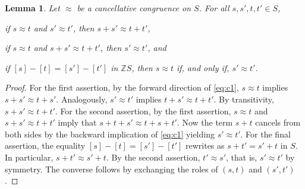 \documentclass[11pt]{scrartcl}
\theoremstyle{definition}
\theoremstyle{plain}
\newtheorem{lemma}[definition]{Lemma}
\theoremstyle{remark}
\begin{document}
	\begin{lemma}\label{lem:cancellation}
		Let $\approx$ be a cancellative congruence on $S$.
		For all $s, s', t, t' \in S$,
		\begin{assertions}
			\item if $s \approx t$ and $s' \approx t'$, then $s + s' \approx t+t'$,
			\item if $s \approx t$ and $s + s' \approx t+t'$, then $s' \approx t'$, and
			\item if $[s] - [t] = [s'] - [t']$ in $\mathbb{Z}S$,
			then $s \approx t$ if, and only if, $s' \approx t'$.
		\end{assertions}
	\end{lemma}
	\begin{proof}
		For the first assertion, by the forward direction of \eqref{eq:c1},
		$s \approx t$ implies $s + s' \approx t + s'$.
		Analogously,
		$s' \approx t'$ implies $t + s' \approx t + t'$.
		By transitivity, $s + s' \approx t + t'$.
For the second assertion,
		by the first assertion,
		 $s \approx t$ and $s + s' \approx t+t'$ imply that
		 $s + t + s' \approx t + s + t'$.
		 Now the term $s + t$ cancels from both sides by the backward implication of \eqref{eq:c1} yielding $s' \approx t'$.
For the final assertion,
		 the equality $[s] - [t] = [s'] - [t']$ rewrites as $s + t' = s' + t$ in $S$. 
			In particular, $s + t' \approx s' + t$.
			By the second assertion, $t' \approx s'$, that is, $s' \approx t'$ by symmetry.
			The converse follows by exchanging the roles of $(s,t)$ and $(s',t')$.
	\end{proof}
\end{document}
